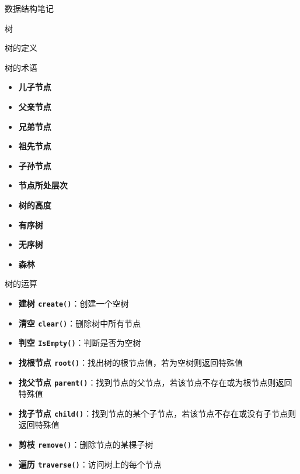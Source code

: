 \documentclass[
  ignorenonframetext,
]{beamer}
\providecommand{\tightlist}{%
  \setlength{\itemsep}{0pt}\setlength{\parskip}{0pt}}
\begin{document}
\begin{frame}[fragile]{数据结构笔记}
\begin{block}{树}
\begin{block}{树的定义}
\begin{block}{树的术语}
\begin{itemize}
  \begin{itemize}
  \tightlist
  \item
    节点的度：节点的子树个数
  \item
    树的度：树中所有节点的度的最大值
  \end{itemize}
\item
  \textbf{儿子节点}
\item
  \textbf{父亲节点}
\item
  \textbf{兄弟节点}
\item
  \textbf{祖先节点}
\item
  \textbf{子孙节点}
\item
  \textbf{节点所处层次}
\item
  \textbf{树的高度}
\item
  \textbf{有序树}
\item
  \textbf{无序树}
\item
  \textbf{森林}
\end{itemize}
\end{block}

\begin{block}{树的运算}
\protect{}\label{ux6811ux7684ux8fd0ux7b97}
\begin{itemize}
\tightlist
\item
  \textbf{建树 \texttt{create()}}：创建一个空树
\item
  \textbf{清空 \texttt{clear()}}：删除树中所有节点
\item
  \textbf{判空 \texttt{IsEmpty()}}：判断是否为空树
\item
  \textbf{找根节点
  \texttt{root()}}：找出树的根节点值，若为空树则返回特殊值
\item
  \textbf{找父节点
  \texttt{parent()}}：找到节点的父节点，若该节点不存在或为根节点则返回特殊值
\item
  \textbf{找子节点
  \texttt{child()}}：找到节点的某个子节点，若该节点不存在或没有子节点则返回特殊值
\item
  \textbf{剪枝 \texttt{remove()}}：删除节点的某棵子树
\item
  \textbf{遍历 \texttt{traverse()}}：访问树上的每个节点
\end{itemize}
\end{block}


\end{block}
\end{block}
\end{frame}
\end{document}
